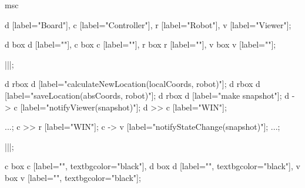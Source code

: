 \begin{msc}
msc
{

d [label="Board"],
c [label="Controller"],
r [label="Robot"],
v [label="Viewer"];


d box d [label=""],
c box c [label=""],
r box r [label=""],
v box v [label=""];


|||;

d rbox d [label="calculateNewLocation(localCoords, robot)"];
d rbox d [label="saveLocation(absCoords, robot)"];
d rbox d [label="make snapshot"];
d -> c [label="notifyViewer(snapshot)"];
d >> c [label="WIN"];

...;
c >> r [label="WIN"];
c -> v [label="notifyStateChange(snapshot)"];
...;


|||;

c box c [label="", textbgcolor="black"],
d box d [label="", textbgcolor="black"],
v box v [label="", textbgcolor="black"];

}
\end{msc}
